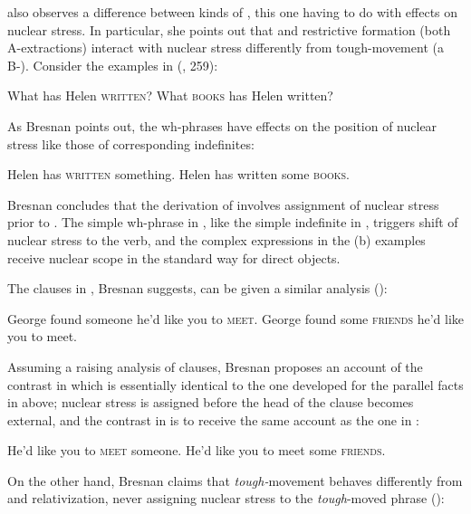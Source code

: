 \documentclass[output=paper]{LSP/langsci}
\begin{document}
\citet{Bresnan1971} also observes a difference between kinds of , this one having to do with effects on nuclear stress.  In particular, she points out that  and restrictive  formation (both A-extractions) interact with nuclear stress differently from tough-movement (a B-).  Consider the  examples in  (\citealt{Bresnan1971}, 259):


\ea%
    \label{ex:richards:26bis}
    
\ea\label{ex:richards:26bisa} What has Helen \textsc{written}?
\ex\label{ex:richards:26bisb} What \textsc{books} has Helen written?
\z
\z

As Bresnan points out, the wh-phrases have effects on the position of nuclear stress like those of corresponding indefinites:


\ea%
    \label{ex:richards:27bis}
\ea\label{ex:richards:27bisa} Helen has \textsc{written} something.
\ex Helen has written some \textsc{books}.
\z
\z

Bresnan concludes that the derivation of  involves assignment of nuclear stress prior to .  The simple wh-phrase in , like the simple indefinite in , triggers shift of nuclear stress to the verb, and the complex expressions in the (b) examples receive nuclear scope in the standard way for direct objects.  

  The  clauses in , Bresnan suggests, can be given a similar analysis (\citealt[259]{Bresnan1971}):


\ea%
    \label{ex:richards:28}
  \ea George found someone he'd like you to \textsc{meet}.
\ex George found some \textsc{friends} he'd like you to meet.
\z
\z

Assuming a raising analysis of  clauses, Bresnan proposes an account of the contrast in  which is essentially identical to the one developed for the parallel  facts in  above; nuclear stress is assigned before the head of the  clause becomes external, and the contrast in  is to receive the same account as the one in :


\ea%
    \label{ex:richards:29}
\ea He'd like you to \textsc{meet} someone.
\ex He'd like you to meet some \textsc{friends}.
\z
\z

  On the other hand, Bresnan claims that \textit{tough-}movement behaves differently from  and relativization, never assigning nuclear stress to the \textit{tough}{}-moved phrase (\citealt[265]{Bresnan1971}):
\end{document}
